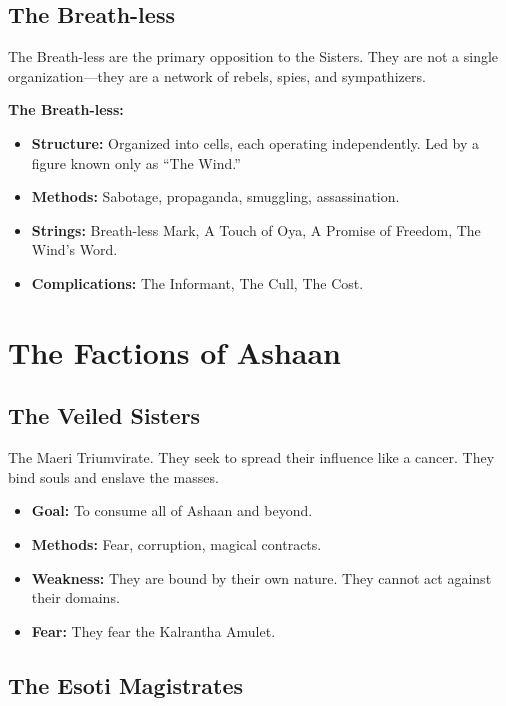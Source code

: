 \documentclass[11pt,twoside]{book}
\newenvironment{mechanicbox}{\begin{mdframed}[style=mechanicbox]}{\end{mdframed}}
\begin{document}
\section{The Breath-less}

The Breath-less are the primary opposition to the Sisters. They are not a single organization---they are a network of rebels, spies, and sympathizers.

\begin{mechanicbox}
\textbf{The Breath-less:}
\begin{itemize}
    \item \textbf{Structure:} Organized into cells, each operating independently. Led by a figure known only as ``The Wind.''
    \item \textbf{Methods:} Sabotage, propaganda, smuggling, assassination.
    \item \textbf{Strings:} Breath-less Mark, A Touch of Oya, A Promise of Freedom, The Wind's Word.
    \item \textbf{Complications:} The Informant, The Cull, The Cost.
\end{itemize}
\end{mechanicbox}

\chapter{The Factions of Ashaan}

\section{The Veiled Sisters}

The Maeri Triumvirate. They seek to spread their influence like a cancer. They bind souls and enslave the masses.

\begin{itemize}
    \item \textbf{Goal:} To consume all of Ashaan and beyond.
    \item \textbf{Methods:} Fear, corruption, magical contracts.
    \item \textbf{Weakness:} They are bound by their own nature. They cannot act against their domains.
    \item \textbf{Fear:} They fear the Kalrantha Amulet.
\end{itemize}

\section{The Esoti Magistrates}
\end{document}
